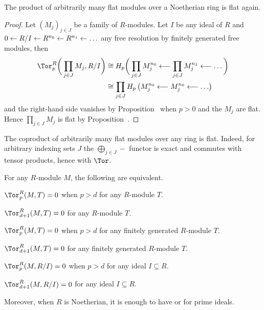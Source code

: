 \documentclass[a4paper,parskip=half,numbers=enddot, DIV=12]{scrreprt}
\begin{document}
\begin{example}
	The product of arbitrarily many flat modules over a Noetherian ring is flat again.
\end{example}
\begin{proof}
	Let $(M_j)_{j\in J}$ be a family of $R$-modules. Let $I$ be any ideal of $R$ and $0\lmorphism R/I\lmorphism R^{n_0}\lmorphism R^{n_1}\lmorphism\ldots$ any free resolution by finitely generated free modules, then
	\begin{align*}
		\Tor_p^R\bigg(\prod_{j\in J}M_j,R/I\bigg)&\cong H_p\bigg(\prod_{j\in J}M_j^{n_0}\lmorphism\prod_{j\in J}M_j^{n_1}\lmorphism\ldots \bigg)\\
		&\cong \prod_{j\in J} H_p\left(M_j^{n_0}\lmorphism M_j^{n_0}\lmorphism\ldots\right)
	\end{align*}
	and the right-hand side vanishes by Proposition~ when $p>0$ and the $M_j$ are flat. Hence $\prod_{j\in J}M_j$ is flat by Proposition~.
\end{proof}
\begin{example}
	The coproduct of arbitrarily many flat modules over any ring is flat. Indeed, for arbitrary indexing sets $J$ the $\bigoplus_{j\in J}-$ functor is exact and commutes with tensor products, hence with $\Tor$.
\end{example}
\begin{fact}
	For any $R$-module $M$, the following are equivalent.
	\begin{alphanumerate}
		\item $\Tor_p^R(M,T)=0$ when $p>d$ for any $R$-module $T$.
		\item $\Tor_{d+1}^R(M,T)=0$ for any $R$-module $T$.
		\item $\Tor_p^R(M,T)=0$ when $p>d$ for any finitely generated $R$-module $T$.
		\item $\Tor_{d+1}^R(M,T)=0$ for any finitely generated $R$-module $T$.		
		\item $\Tor_p^R(M,R/I)=0$ when $p>d$ for any ideal $I\subseteq R$.
		\item $\Tor_{d+1}^R(M,R/I)=0$ for any ideal $I\subseteq R$.
	\end{alphanumerate}
	Moreover, when $R$ is Noetherian, it is enough to have  or  for prime ideals.
\end{fact}
\end{document}
